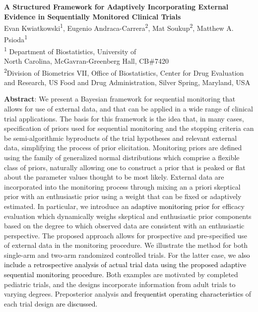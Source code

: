 \documentclass[12pt]{article}
\begin{document}
	\begin{center}
		\textbf{A Structured Framework for Adaptively Incorporating External\\ 
		         Evidence in Sequentially Monitored Clinical Trials} \\

		\vspace{1cm}
			Evan Kwiatkowski\textsuperscript{1}, Eugenio Andraca-Carrera\textsuperscript{2}, 
			Mat Soukup\textsuperscript{2}, Matthew A. Psioda\textsuperscript{1}\\

		\vspace{1cm}
			\textsuperscript{1} Department of Biostatistics, University of \\
			North Carolina, McGavran-Greenberg Hall, CB\#7420 \\

		\vspace{1cm}
			\textsuperscript{2}{Division of Biometrics VII, Office of Biostatistics, Center for Drug Evaluation and Research, US Food and Drug Administration, Silver Spring, Maryland, USA}
	\end{center}


\vspace{1.5cm}
\noindent
\textbf{Abstract}:
{We present a Bayesian framework for sequential monitoring that allows for use of external data, and that 
can be applied in a wide range of clinical trial applications. The basis for this framework is the 
idea that, in many cases, specification of priors used for sequential monitoring and the stopping criteria can be semi-algorithmic byproducts of the trial hypotheses and relevant external data, simplifying the process of prior elicitation. Monitoring priors are defined using the family of generalized normal distributions which comprise a flexible class of priors, naturally allowing one to construct a prior that is peaked or flat about the parameter values thought to be most likely. External data are incorporated into the monitoring process through mixing an a priori skeptical prior with an enthusiastic prior using a weight that can be fixed or adaptively estimated. In particular, we introduce an \textcolor{black}{adaptive monitoring prior} for efficacy evaluation which dynamically weighs skeptical and enthusiastic prior components based on the degree to which observed data \textcolor{black}{are} consistent with an enthusiastic perspective. The proposed approach allows for prospective and pre-specified use of external data in the monitoring procedure.
%
We illustrate the method for both single-arm and two-arm randomized controlled trials. For the latter case, we \textcolor{black}{also include a retrospective analysis of actual trial data using the proposed adaptive sequential monitoring procedure}. Both examples are motivated by completed pediatric trials, and the designs incorporate information from adult trials to varying degrees. Preposterior analysis \textcolor{black}{and frequentist operating characteristics} of each trial design \textcolor{black}{are discussed.}}
\end{document}
